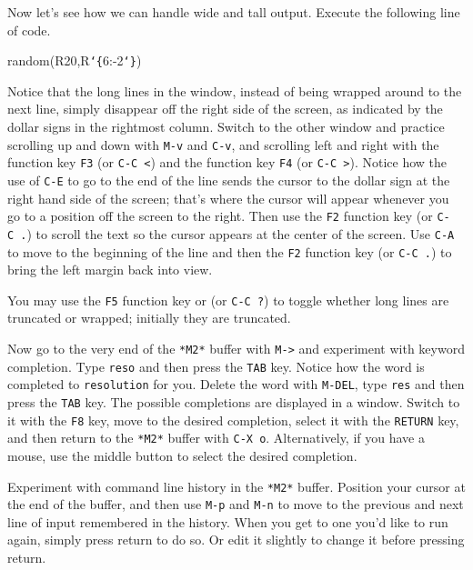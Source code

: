 Now let's see how we can handle wide and tall \Mtwo output.  Execute the
following line of code.

\smallskip

{\ttfamily\obeylines
random(R{}20,R{}{\tt\char`\{}6:-2{\tt\char`\}})
}

\smallskip

Notice that the long lines in the \Mtwo window, instead of being wrapped
around to the next line, simply disappear off the right side of the screen,
as indicated by the dollar signs in the rightmost column.  Switch to the
other window and practice scrolling up and down with {\tt {}M-v} and {\tt {}C-v}, 
and scrolling left and right with the function key {\tt {}F3} (or {\tt {}C-C\ <}) 
and the function key {\tt {}F4} (or {\tt {}C-C\ >}).  Notice how the use of
{\tt {}C-E} to go to the end of the line
sends the cursor to the dollar sign at the right hand side of the screen;
that's where the cursor will appear whenever you go to a position off the
screen to the right.  Then use the {\tt {}F2} function key (or {\tt {}C-C\ .}) to 
scroll the text so the cursor appears at the center of the screen.  Use {\tt {}C-A} to 
move to the beginning of the line and then the {\tt {}F2} function key 
(or {\tt {}C-C\ .}) to bring the left margin back into view.

You may use the {\tt {}F5} function key or (or {\tt {}C-C\ ?}) to 
toggle whether long lines are truncated or wrapped; initially they are truncated.

Now go to the very end of the {\tt {}*M2*} buffer with {\tt {}M->} and 
experiment with keyword completion.  Type {\tt {}reso} and then press the 
{\tt {}TAB} key.  Notice how the word is completed to {\tt {}resolution}
for you.  Delete the word with {\tt {}M-DEL}, type {\tt {}res}
and then press the {\tt {}TAB} key.  The possible completions are displayed 
in a window.  Switch to it with the {\tt {}F8} key, move to the desired 
completion, select it with the {\tt {}RETURN} key, and then return to the 
{\tt {}*M2*} buffer with {\tt {}C-X\ o}.  Alternatively, if you have a
mouse, use the middle button to select the desired completion.

Experiment with command line history in the {\tt {}*M2*} buffer.  Position 
your cursor at the end of the buffer, and then use {\tt {}M-p} and {\tt {}M-n} 
to move to the previous and next line of input remembered in the history.  When you 
get to one you'd like to run again, simply press return to do so.  Or edit it
slightly to change it before pressing return.


